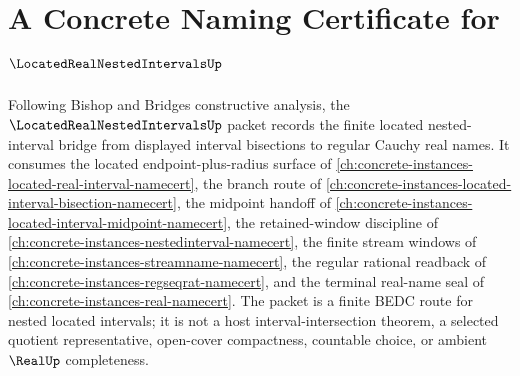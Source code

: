 \chapter{A Concrete Naming Certificate for $\LocatedRealNestedIntervalsUp$}
\label{ch:concrete-instances-located-real-nested-intervals-namecert}

Following Bishop and Bridges constructive analysis, the $\LocatedRealNestedIntervalsUp$ packet records the finite located nested-interval bridge from displayed interval bisections to regular Cauchy real names. It consumes the located endpoint-plus-radius surface of \autoref{ch:concrete-instances-located-real-interval-namecert}, the branch route of \autoref{ch:concrete-instances-located-interval-bisection-namecert}, the midpoint handoff of \autoref{ch:concrete-instances-located-interval-midpoint-namecert}, the retained-window discipline of \autoref{ch:concrete-instances-nestedinterval-namecert}, the finite stream windows of \autoref{ch:concrete-instances-streamname-namecert}, the regular rational readback of \autoref{ch:concrete-instances-regseqrat-namecert}, and the terminal real-name seal of \autoref{ch:concrete-instances-real-namecert}. The packet is a finite BEDC route for nested located intervals; it is not a host interval-intersection theorem, a selected quotient representative, open-cover compactness, countable choice, or ambient $\RealUp$ completeness.

